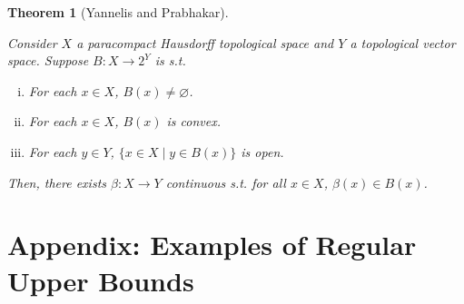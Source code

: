 \documentclass[11pt]{article}
\theoremstyle{definition}
\theoremstyle{plain}
\newtheorem{theorem}{Theorem}%
\begin{document}
\begin{samepage}
\begin{theorem} [Yannelis and Prabhakar]
\label{thm:selection}

Consider $X$ a paracompact Hausdorff topological space and $Y$ a topological vector space. Suppose $B: X \rightarrow 2^Y$ is s.t.

\begin{enumerate}[i.]

\item For each $x \in X$, $B\left(x\right) \ne \varnothing$.
\item For each $x \in X$, $B\left(x\right)$ is convex.
\item For each $y \in Y$, $\{x \in X \mid y \in B\left(x\right)\}$ is open.

\end{enumerate}

Then, there exists $\beta: X \rightarrow Y$ continuous s.t. for all $x \in X$, $\beta\left(x\right) \in B\left(x\right)$.

\end{theorem}
\end{samepage}

\section{Appendix: Examples of Regular Upper Bounds}
\label{sec:examples}
\end{document}
